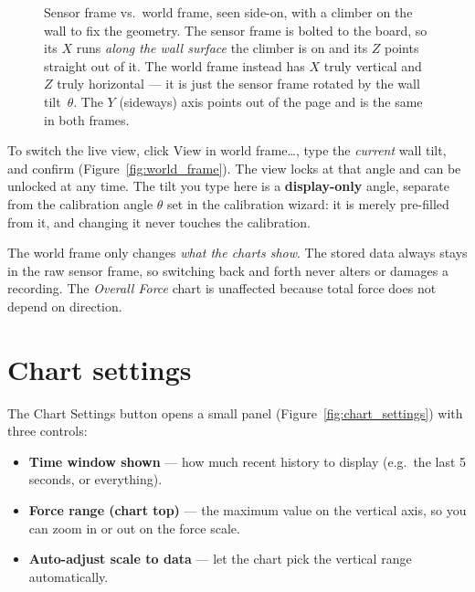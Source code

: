\documentclass[11pt,a4paper]{article}
\begin{document}
\begin{figure}[H]
\caption{Sensor frame vs.\ world frame, seen side-on, with a climber on the wall to
fix the geometry. The \textcolor{orange!80!black}{sensor frame} is bolted to the
board, so its $X$ runs \emph{along the wall surface} the climber is on and its $Z$
points straight out of it. The \textcolor{accent}{world frame} instead has $X$ truly
vertical and $Z$ truly horizontal --- it is just the sensor frame rotated by the
wall tilt~$\theta$. The $Y$ (sideways) axis points out of the page and is the same in
both frames.}
\label{fig:frames}
\end{figure}

To switch the live view, click \textsf{View in world frame\ldots}, type the
\emph{current} wall tilt, and confirm (Figure~\ref{fig:world_frame}). The view
locks at that angle and can be unlocked at any time. The tilt you type here is a
\textbf{display-only} angle, separate from the calibration angle $\theta$ set in
the calibration wizard: it is merely pre-filled from it, and changing it never
touches the calibration.


\begin{infobox}
The world frame only changes \emph{what the charts show}. The stored data always
stays in the raw sensor frame, so switching back and forth never alters or damages
a recording. The \emph{Overall Force} chart is unaffected because total force does
not depend on direction.
\end{infobox}

\section{Chart settings}
\label{sec:chartsettings}

The \textsf{Chart Settings} button opens a small panel
(Figure~\ref{fig:chart_settings}) with three controls:
\begin{itemize}[leftmargin=1.4em]
  \item \textbf{Time window shown} --- how much recent history to display
        (e.g.\ the last 5 seconds, or everything).
  \item \textbf{Force range (chart top)} --- the maximum value on the vertical
        axis, so you can zoom in or out on the force scale.
  \item \textbf{Auto-adjust scale to data} --- let the chart pick the vertical
        range automatically.
\end{itemize}
\end{document}
